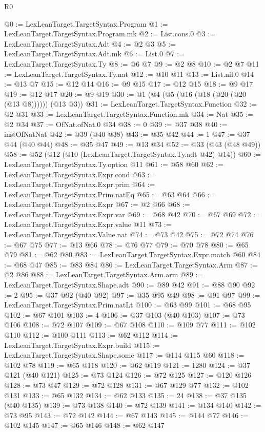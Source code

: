 \begin{lexlean}{R0}
\begin{coremodule}
@0 := LexLeanTarget.TargetSyntax.Program
@1 := LexLeanTarget.TargetSyntax.Program.mk
@2 := List.cons.{0}
@3 := LexLeanTarget.TargetSyntax.Adt
@4 := @2 @3
@5 := LexLeanTarget.TargetSyntax.Adt.mk
@6 := List.{0}
@7 := LexLeanTarget.TargetSyntax.Ty
@8 := @6 @7
@9 := @2 @8
@10 := @2 @7
@11 := LexLeanTarget.TargetSyntax.Ty.nat
@12 := @10 @11
@13 := List.nil.{0}
@14 := @13 @7
@15 := @12 @14
@16 := @9 @15
@17 := @12 @15
@18 := @9 @17
@19 := @12 @17
@20 := @9 @19
@30 := @1 (@4 (@5 (@16 (@18 (@20 (@20 (@13 @8)))))) (@13 @3))
@31 := LexLeanTarget.TargetSyntax.Function
@32 := @2 @31
@33 := LexLeanTarget.TargetSyntax.Function.mk
@34 := Nat
@35 := @2 @34
@37 := OfNat.ofNat.{0} @34
@38 := 0
@39 := @37 @38
@40 := instOfNatNat
@42 := @39 (@40 @38)
@43 := @35 @42
@44 := 1
@47 := @37 @44 (@40 @44)
@48 := @35 @47
@49 := @13 @34
@52 := @33 (@43 (@48 @49))
@58 := @52 (@12 (@10 (LexLeanTarget.TargetSyntax.Ty.adt @42) @14))
@60 := LexLeanTarget.TargetSyntax.Ty.option @11
@61 := @58 @60
@62 := LexLeanTarget.TargetSyntax.Expr.cond
@63 := LexLeanTarget.TargetSyntax.Expr.prim
@64 := LexLeanTarget.TargetSyntax.Prim.natEq
@65 := @63 @64
@66 := LexLeanTarget.TargetSyntax.Expr
@67 := @2 @66
@68 := LexLeanTarget.TargetSyntax.Expr.var
@69 := @68 @42
@70 := @67 @69
@72 := LexLeanTarget.TargetSyntax.Expr.value @11
@73 := LexLeanTarget.TargetSyntax.Value.nat
@74 := @73 @42
@75 := @72 @74
@76 := @67 @75
@77 := @13 @66
@78 := @76 @77
@79 := @70 @78
@80 := @65 @79
@81 := @62 @80
@83 := LexLeanTarget.TargetSyntax.Expr.match @60
@84 := @68 @47
@85 := @83 @84
@86 := LexLeanTarget.TargetSyntax.Arm
@87 := @2 @86
@88 := LexLeanTarget.TargetSyntax.Arm.arm
@89 := LexLeanTarget.TargetSyntax.Shape.adt
@90 := @89 @42
@91 := @88 @90
@92 := 2
@95 := @37 @92 (@40 @92)
@97 := @35 @95 @49
@98 := @91 @97
@99 := LexLeanTarget.TargetSyntax.Prim.natLt
@100 := @63 @99
@101 := @68 @95
@102 := @67 @101
@103 := 4
@106 := @37 @103 (@40 @103)
@107 := @73 @106
@108 := @72 @107
@109 := @67 @108
@110 := @109 @77
@111 := @102 @110
@112 := @100 @111
@113 := @62 @112
@114 := LexLeanTarget.TargetSyntax.Expr.build
@115 := LexLeanTarget.TargetSyntax.Shape.some
@117 := @114 @115 @60
@118 := @102 @78
@119 := @65 @118
@120 := @62 @119
@121 := 1280
@124 := @37 @121 (@40 @121)
@125 := @73 @124
@126 := @72 @125
@127 := @120 @126
@128 := @73 @47
@129 := @72 @128
@131 := @67 @129 @77
@132 := @102 @131
@133 := @65 @132
@134 := @62 @133
@135 := 24
@138 := @37 @135 (@40 @135)
@139 := @73 @138
@140 := @72 @139
@141 := @134 @140
@142 := @73 @95
@143 := @72 @142
@144 := @67 @143
@145 := @144 @77
@146 := @102 @145
@147 := @65 @146
@148 := @62 @147

\end{coremodule}
\end{lexlean}
